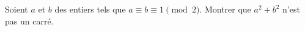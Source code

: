 Soient $a$ et $b$ des entiers tels que $a \equiv b \equiv 1 \pmod 2$. Montrer que $a^2 + b^2$ n'est pas un carré.
